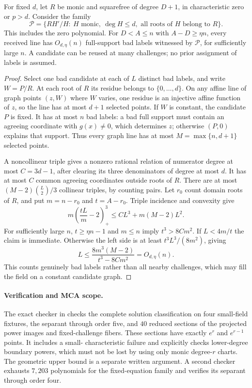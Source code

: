 \begin{proposition}
\label{prop:logarithmic-family-mca}
For fixed $d$, let $R$ be monic and squarefree of degree $D+1$,
in characteristic zero or $p>d$. Consider the family
\[
 \mathcal P=\{RH'/H:\ H\text{ monic},\ \deg H\le d,
                  \text{ all roots of }H\text{ belong to }R\}.
\]
This includes the zero polynomial. For $D<A\le n$ with
$A-D\ge\eta n$, every received line has $O_{d,\eta}(n)$
full-support bad labels witnessed by $\mathcal P$, for sufficiently
large $n$. A candidate can be reused at many challenges; no prior
assignment of labels is assumed.
\end{proposition}
\begin{proof}
Select one bad candidate at each of $L$ distinct bad labels, and
write $W=P/R$. At each root of $R$ its residue belongs to
$\{0,\ldots,d\}$. On any affine line of graph points $(z,W)$
where $W$ varies, one residue is an injective affine function of
$z$, so the line has at most $d+1$ selected points. If $W$ is
constant, the candidate $P$ is fixed. It has at most $n$ bad labels:
a bad full support must contain an agreeing coordinate with
$g(x)\ne0$, which determines $z$; otherwise $(P,0)$ explains
that support. Thus every graph line has at most
$M=\max\{n,d+1\}$ selected points.

A noncollinear triple gives a nonzero rational relation of numerator
degree at most $C=3d-1$, after clearing its three denominators of
degree at most $d$. It has at most $C$ common agreeing coordinates
outside roots of $R$. There are at most
$(M-2)\binom L2/3$ collinear triples, by counting pairs.
Let $r_0$ count domain roots of $R$, and put $m=n-r_0$ and
$t=A-r_0$. Triple incidence and convexity give
\[
 m\left(\frac{tL}{m}-2\right)_+^3
 \le C L^3+m(M-2)L^2.
\]
For sufficiently large $n$, $t\ge\eta n-1$ and $m\le n$ imply
$t^3>8Cm^2$. If $L<4m/t$ the claim is immediate. Otherwise the
left side is at least $t^3L^3/(8m^2)$, giving
\[
 L\le\frac{8m^3(M-2)}{t^3-8Cm^2}=O_{d,\eta}(n).
\]
This counts genuinely bad labels rather than all nearby challenges,
which may fill the field on a constant candidate graph.
\end{proof}

\paragraph{Verification and MCA scope.}
The exact checker in 
checks the complete solution classification on four small-field fixtures,
the separant through order five, and $40$ reduced sections of the
projected power images and fixed-challenge fibers. These sections
have exactly $e^r$ and $e^{r-1}$ points. It includes a small-
characteristic failure and explicitly checks lower-degree boundary
powers, which must not be lost by using only monic degree-$r$ charts.
The geometric upper bound is a separate written argument. A second
checker exhausts $7{,}203$ polynomials for the fixed-equation family
and verifies its separant through order four.

